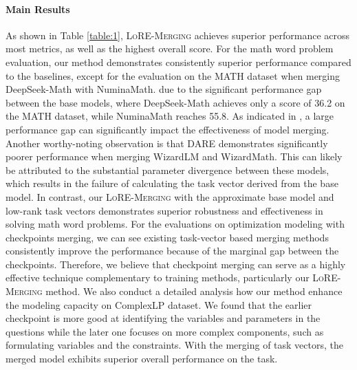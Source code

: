 \paragraph{Main Results}
As shown in Table \ref{table:1}, \textsc{LoRE-Merging} achieves superior performance across most metrics, as well as the highest overall score. For the math word problem evaluation, our method demonstrates consistently superior performance compared to the baselines, except for the evaluation on the MATH dataset when merging DeepSeek-Math with NuminaMath. due to the significant performance gap between the base models, where DeepSeek-Math achieves only a score of 36.2 on the MATH dataset, while NuminaMath reaches 55.8. As indicated in \citet{yao2024determine}, a large performance gap can significantly impact the effectiveness of model merging. Another worthy-noting observation is that DARE demonstrates significantly poorer performance when merging WizardLM and WizardMath. This can likely be attributed to the substantial parameter divergence between these models, which results in the failure of calculating the task vector derived from the base model.
In contrast, our \textsc{LoRE-Merging} with the approximate base model and low-rank task vectors demonstrates superior robustness and effectiveness in solving math word problems.
For the evaluations on optimization modeling with checkpoints merging, we can see existing task-vector based merging methods consistently improve the performance because of the marginal gap between the checkpoints. Therefore, we believe that checkpoint merging can serve as a highly effective technique complementary to training methods, particularly our \textsc{LoRE-Merging} method. We also conduct a detailed analysis how our method enhance the modeling capacity on ComplexLP dataset. We found that the earlier checkpoint is more good at identifying the variables and parameters in the questions while the later one focuses on more complex components, such as formulating variables and the constraints. With the merging of task vectors, the merged model exhibits superior overall performance on the task.



